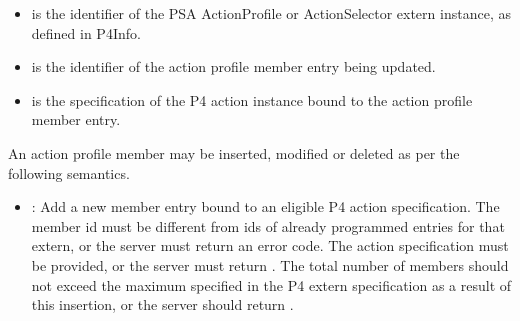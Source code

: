 \documentclass[11pt]{article}
\begin{document}
{%
\begin{itemize}%

\item{}
 is the  identifier of the PSA ActionProfile or
ActionSelector extern instance, as defined in P4Info.%

\item{}
 is the  identifier of the action profile member entry being
updated.%

\item{}
 is the specification of the P4 action instance bound to the action
profile member entry.%
\end{itemize}%

\noindent{}An action profile member may be inserted, modified or deleted as per the
following semantics.%

\begin{itemize}[noitemsep,topsep=\mdcompacttopsep]%

\item{}: Add a new member entry bound to an eligible P4 action
specification. The member id must be different from ids of already programmed
entries for that extern, or the server must return an  error
code. The action specification must be provided, or the server must return
. The total number of members should not exceed the maximum
specified in the P4 extern specification as a result of this insertion, or the
server should return .%


\end{itemize}}
\end{document}
